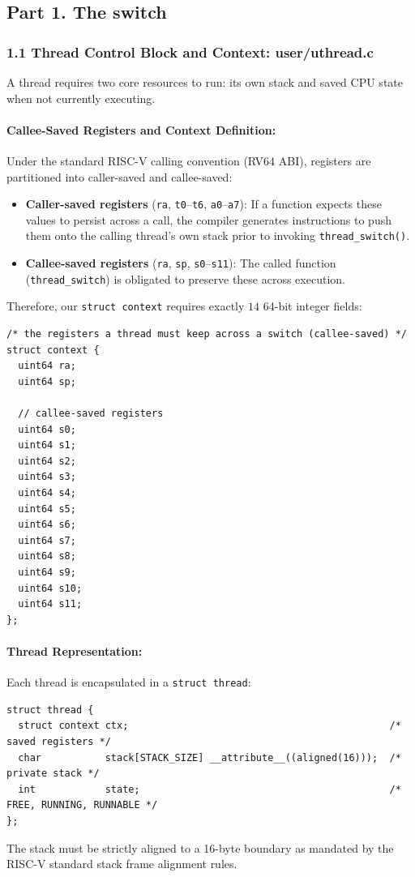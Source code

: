 \documentclass{labreport}
\begin{document}
\subsection{Part 1. The switch}

\subsubsection{1.1 Thread Control Block and Context: user/uthread.c}
A thread requires two core resources to run: its own stack and saved CPU state when not currently executing. 

\paragraph{Callee-Saved Registers and Context Definition:}
Under the standard RISC-V calling convention (RV64 ABI), registers are partitioned into caller-saved and callee-saved:
\begin{itemize}[noitemsep]
    \item \textbf{Caller-saved registers} (\texttt{ra}, \texttt{t0}--\texttt{t6}, \texttt{a0}--\texttt{a7}): If a function expects these values to persist across a call, the compiler generates instructions to push them onto the calling thread's own stack prior to invoking \texttt{thread\_switch()}.
    \item \textbf{Callee-saved registers} (\texttt{ra}, \texttt{sp}, \texttt{s0}--\texttt{s11}): The called function (\texttt{thread\_switch}) is obligated to preserve these across execution.
\end{itemize}

Therefore, our \texttt{struct context} requires exactly $14$ 64-bit integer fields:

\begin{lstlisting}[style=c]
/* the registers a thread must keep across a switch (callee-saved) */
struct context {
  uint64 ra;
  uint64 sp;

  // callee-saved registers
  uint64 s0;
  uint64 s1;
  uint64 s2;
  uint64 s3;
  uint64 s4;
  uint64 s5;
  uint64 s6;
  uint64 s7;
  uint64 s8;
  uint64 s9;
  uint64 s10;
  uint64 s11;
};
\end{lstlisting}

\paragraph{Thread Representation:}
Each thread is encapsulated in a \texttt{struct thread}:
\begin{lstlisting}[style=c]
struct thread {
  struct context ctx;                                             /* saved registers */
  char           stack[STACK_SIZE] __attribute__((aligned(16)));  /* private stack */
  int            state;                                           /* FREE, RUNNING, RUNNABLE */
};
\end{lstlisting}
The stack must be strictly aligned to a 16-byte boundary as mandated by the RISC-V standard stack frame alignment rules.
\end{document}
